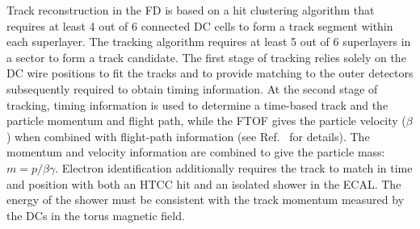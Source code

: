\documentclass[final,3p,twocolumn]{elsarticle}
\begin{document}
Track reconstruction in the FD is based on a hit clustering algorithm that requires at least 4 out of 6 connected DC
cells to form a track segment within each superlayer.  The tracking algorithm requires at least 5 out of 6 superlayers
in a sector to form a track candidate. The first stage of tracking relies solely on the DC wire positions to fit the
tracks and to provide matching to the outer detectors subsequently required to obtain timing information. At the
second stage of tracking, timing information is used to determine a time-based track and the particle momentum
and flight path, while the FTOF gives the particle velocity ($\beta$) when combined with flight-path information
(see Ref.~\cite{Software} for details). The momentum and velocity information are combined to give the particle
mass: $m = p/\beta\gamma$. Electron identification additionally requires the track to match in time and position
with both an HTCC hit and an isolated shower in the ECAL. The energy of the shower must be consistent with the
track momentum measured by the DCs in the torus magnetic field. 
\end{document}
